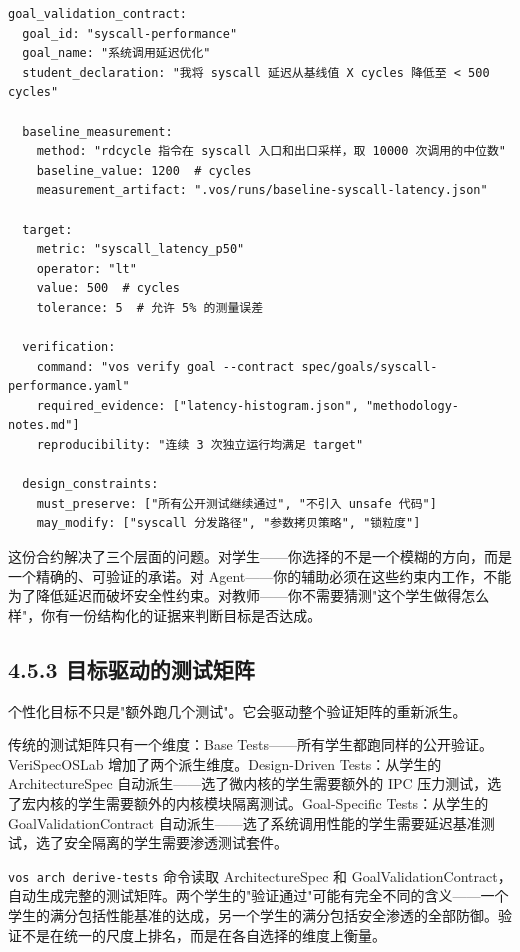 \documentclass[UTF8,a4paper,12pt,openany]{ctexrep}
\newcommand{\passthrough}[1]{#1}
\begin{document}
\begin{lstlisting}
goal_validation_contract:
  goal_id: "syscall-performance"
  goal_name: "系统调用延迟优化"
  student_declaration: "我将 syscall 延迟从基线值 X cycles 降低至 < 500 cycles"
  
  baseline_measurement:
    method: "rdcycle 指令在 syscall 入口和出口采样，取 10000 次调用的中位数"
    baseline_value: 1200  # cycles
    measurement_artifact: ".vos/runs/baseline-syscall-latency.json"
  
  target:
    metric: "syscall_latency_p50"
    operator: "lt"
    value: 500  # cycles
    tolerance: 5  # 允许 5% 的测量误差
  
  verification:
    command: "vos verify goal --contract spec/goals/syscall-performance.yaml"
    required_evidence: ["latency-histogram.json", "methodology-notes.md"]
    reproducibility: "连续 3 次独立运行均满足 target"
  
  design_constraints:
    must_preserve: ["所有公开测试继续通过", "不引入 unsafe 代码"]
    may_modify: ["syscall 分发路径", "参数拷贝策略", "锁粒度"]
\end{lstlisting}

这份合约解决了三个层面的问题。对学生------你选择的不是一个模糊的方向，而是一个精确的、可验证的承诺。对 Agent------你的辅助必须在这些约束内工作，不能为了降低延迟而破坏安全性约束。对教师------你不需要猜测"这个学生做得怎么样"，你有一份结构化的证据来判断目标是否达成。

\subsection{4.5.3 目标驱动的测试矩阵}\label{453-ux76eeux6807ux9a71ux52a8ux7684ux6d4bux8bd5ux77e9ux9635}

个性化目标不只是"额外跑几个测试"。它会驱动整个验证矩阵的重新派生。

传统的测试矩阵只有一个维度：Base Tests------所有学生都跑同样的公开验证。VeriSpecOSLab 增加了两个派生维度。Design-Driven Tests：从学生的 ArchitectureSpec 自动派生------选了微内核的学生需要额外的 IPC 压力测试，选了宏内核的学生需要额外的内核模块隔离测试。Goal-Specific Tests：从学生的 GoalValidationContract 自动派生------选了系统调用性能的学生需要延迟基准测试，选了安全隔离的学生需要渗透测试套件。

\passthrough{\lstinline!vos arch derive-tests!} 命令读取 ArchitectureSpec 和 GoalValidationContract，自动生成完整的测试矩阵。两个学生的"验证通过"可能有完全不同的含义------一个学生的满分包括性能基准的达成，另一个学生的满分包括安全渗透的全部防御。验证不是在统一的尺度上排名，而是在各自选择的维度上衡量。
\end{document}
